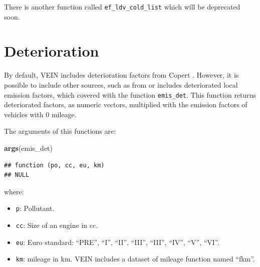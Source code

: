 \documentclass[12pt,graybox,envcountchap,sectrefs]{krantz}
\makeatletter
\newenvironment{Shaded}{\begin{snugshade}}{\end{snugshade}}
\newcommand{\KeywordTok}[1]{\textcolor[rgb]{0.13,0.29,0.53}{\textbf{#1}}}
\newcommand{\NormalTok}[1]{#1}
\providecommand{\tightlist}{%
  \setlength{\itemsep}{0pt}\setlength{\parskip}{0pt}}
\newenvironment{kframe}{%
\medskip{}
\setlength{\fboxsep}{.8em}
 \def\at@end@of@kframe{}%
 \ifinner\ifhmode%
  \def\at@end@of@kframe{\end{minipage}}%
  \begin{minipage}{\columnwidth}%
 \fi\fi%
 \def\FrameCommand##1{\hskip\@totalleftmargin \hskip-\fboxsep
 \colorbox{shadecolor}{##1}\hskip-\fboxsep
     \hskip-\linewidth \hskip-\@totalleftmargin \hskip\columnwidth}%
 \MakeFramed {\advance\hsize-\width
   \@totalleftmargin\z@ \linewidth\hsize
   \@setminipage}}%
 {\par\unskip\endMakeFramed%
 \at@end@of@kframe}
\renewenvironment{Shaded}{\begin{kframe}}{\end{kframe}}
\theoremstyle{definition}
\theoremstyle{definition}
\theoremstyle{definition}
\theoremstyle{remark}
\makeatother
\begin{document}
There is another function called \texttt{ef\_ldv\_cold\_list} which will
be deprecated soon.

\section{Deterioration}\label{det}

By default, VEIN includes deterioration factors from Copert
\citep{NtziachristosSamaras2016}. However, it is possible to include
other sources, such as from \citep{CorvalanVargas2003} or includes
deteriorated local emission factors, which covered with the function
\texttt{emis\_det}. This function returns deteriorated factors, as
numeric vectors, multiplied with the emission factors of vehicles with 0
mileage.

The arguments of this functions are:

\begin{Shaded}
\begin{Highlighting}[]
\KeywordTok{args}\NormalTok{(emis_det)}
\end{Highlighting}
\end{Shaded}

\begin{verbatim}
## function (po, cc, eu, km) 
## NULL
\end{verbatim}

where:

\begin{itemize}
\tightlist
\item
  \texttt{p}: Pollutant.
\item
  \texttt{cc}: Size of an engine in cc.
\item
  \texttt{eu}: Euro standard: ``PRE'', ``I'', ``II'', ``III'', ``III'',
  ``IV'', ``V'', ``VI''.
\item
  \texttt{km}: mileage in km. VEIN includes a dataset of mileage
  function named ``fkm''.
\end{itemize}
\end{document}
